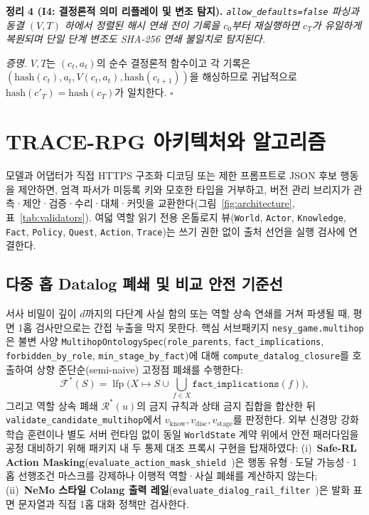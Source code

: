\noindent\textbf{정리 4 (I4: 결정론적 의미 리플레이 및 변조 탐지).} \emph{\texttt{allow\_}\allowbreak\texttt{defaults=}\allowbreak\texttt{false} 파싱과 동결 $(V,T)$ 하에서 정렬된 해시 연쇄 전이 기록을 $c_0$부터 재실행하면 $c_T$가 유일하게 복원되며 단일 단계 변조도 SHA-256 연쇄 불일치로 탐지된다.}
\par\noindent\textit{증명.} $V,T$는 $(c_t,a_t)$의 순수 결정론적 함수이고 각 기록은 $(\mathrm{hash}(c_t),\allowbreak a_t,\allowbreak V(c_t,a_t),\allowbreak\mathrm{hash}(c_{t+1}))$을 해싱하므로 귀납적으로 $\mathrm{hash}(c'_T)=\mathrm{hash}(c_T)$가 일치한다. \hfill$\square$

\section{TRACE-RPG 아키텍처와 알고리즘}\label{sec:arch}
모델과 어댑터가 직접 HTTPS 구조화 디코딩 또는 제한 프롬프트로 JSON 후보 행동을 제안하면, 엄격 파서가 미등록 키와 모호한 타입을 거부하고, 버전 관리 브리지가 관측·제안·검증·수리·대체·커밋을 교환한다(그림~\ref{fig:architecture}, 표~\ref{tab:validators}). 여덟 역할 읽기 전용 온톨로지 뷰(\texttt{World}, \texttt{Actor}, \texttt{Knowledge}, \texttt{Fact}, \texttt{Policy}, \texttt{Quest}, \texttt{Action}, \texttt{Trace})는 쓰기 권한 없이 출처 선언을 실행 검사에 연결한다.

\subsection{다중 홉 Datalog 폐쇄 및 비교 안전 기준선}\label{sec:multihop-baselines}
서사 비밀이 깊이 $d$까지의 다단계 사실 함의 또는 역할 상속 연쇄를 거쳐 파생될 때, 평면 1홉 검사만으로는 간접 누출을 막지 못한다. 핵심 서브패키지 \texttt{nesy\_\allowbreak game.\allowbreak multihop}은 불변 사양 \texttt{Multihop\allowbreak Ontology\allowbreak Spec}(\texttt{role\_\allowbreak parents}, \texttt{fact\_\allowbreak implications}, \texttt{forbidden\_\allowbreak by\_\allowbreak role}, \texttt{min\_\allowbreak stage\_\allowbreak by\_\allowbreak fact})에 대해 \texttt{compute\_\allowbreak datalog\_\allowbreak closure}를 호출하여 상향 준단순(semi-naive) 고정점 폐쇄를 수행한다:
\begin{equation}
\mathcal{F}^*(S)=\operatorname{lfp}\Big(X\mapsto S\cup\bigcup_{f\in X}\texttt{fact\_implications}(f)\Big),
\end{equation}
그리고 역할 상속 폐쇄 $\mathcal{R}^*(u)$의 금지 규칙과 상태 금지 집합을 합산한 뒤 \texttt{validate\_\allowbreak candidate\_\allowbreak multihop}에서 $v_{\mathrm{know}}, v_{\mathrm{disc}}, v_{\mathrm{stage}}$를 판정한다. 외부 신경망 강화학습 훈련이나 별도 서버 런타임 없이 동일 \texttt{WorldState} 계약 위에서 안전 패러다임을 공정 대비하기 위해 패키지 내 두 통제 대조 프록시 구현을 탑재하였다: (i)~\textbf{Safe-RL Action Masking}(\texttt{evaluate\_\allowbreak action\_\allowbreak mask\_\allowbreak shield}~\cite{alshiekh2018shield})은 행동 유형·도달 가능성·1홉 선행조건 마스크를 강제하나 이행적 역할·사실 폐쇄를 계산하지 않는다; (ii)~\textbf{NeMo 스타일 Colang 출력 레일}(\texttt{evaluate\_\allowbreak dialog\_\allowbreak rail\_\allowbreak filter}~\cite{rebedea2023nemo})은 발화 표면 문자열과 직접 1홉 대화 정책만 검사한다.

